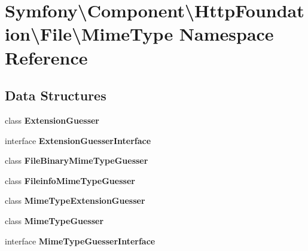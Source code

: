 \section{Symfony\textbackslash{}Component\textbackslash{}Http\+Foundation\textbackslash{}File\textbackslash{}Mime\+Type Namespace Reference}
\label{namespace_symfony_1_1_component_1_1_http_foundation_1_1_file_1_1_mime_type}
\subsection*{Data Structures}
\begin{DoxyCompactItemize}
\item 
class {\bf Extension\+Guesser}
\item 
interface {\bf Extension\+Guesser\+Interface}
\item 
class {\bf File\+Binary\+Mime\+Type\+Guesser}
\item 
class {\bf Fileinfo\+Mime\+Type\+Guesser}
\item 
class {\bf Mime\+Type\+Extension\+Guesser}
\item 
class {\bf Mime\+Type\+Guesser}
\item 
interface {\bf Mime\+Type\+Guesser\+Interface}
\end{DoxyCompactItemize}
